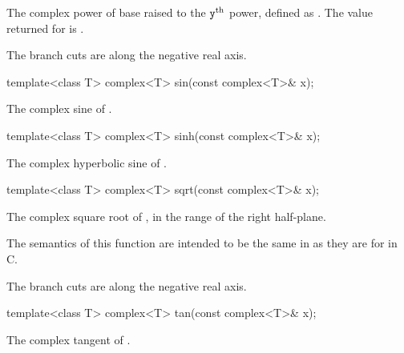 \begin{itemdescr}
\pnum
\returns
The complex power of base  raised to the $\texttt{y}^\text{th}$ power,
defined as
.
The value returned for
is .

\pnum
\remarks
The branch cuts are along the negative real axis.
\end{itemdescr}

%
\begin{itemdecl}
template<class T> complex<T> sin(const complex<T>& x);
\end{itemdecl}

\begin{itemdescr}
\pnum
\returns
The complex sine of .
\end{itemdescr}

%
\begin{itemdecl}
template<class T> complex<T> sinh(const complex<T>& x);
\end{itemdecl}

\begin{itemdescr}
\pnum
\returns
The complex hyperbolic sine of .
\end{itemdescr}

%
\begin{itemdecl}
template<class T> complex<T> sqrt(const complex<T>& x);
\end{itemdecl}

\begin{itemdescr}
\pnum
\returns
The complex square root of , in the range of the right
half-plane.
\begin{note}
The semantics of this function are intended to be the same in \Cpp{}
as they are for  in C.
\end{note}

\pnum
\remarks
The branch cuts are along the negative real axis.
\end{itemdescr}

%
\begin{itemdecl}
template<class T> complex<T> tan(const complex<T>& x);
\end{itemdecl}

\begin{itemdescr}
\pnum
\returns
The complex tangent of .
\end{itemdescr}

